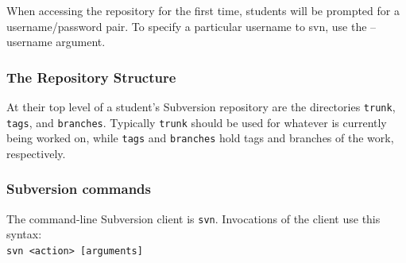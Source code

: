 When accessing the repository for the first time, students will be prompted for a username/password pair. To specify a particular username to svn, use the --username argument.

\subsubsection{The Repository Structure}

At their top level of a student's Subversion repository are the directories \texttt{trunk}, \texttt{tags}, and \texttt{branches}. Typically \texttt{trunk} should be used for whatever is currently being worked on, while \texttt{tags} and \texttt{branches} hold tags and branches of the work, respectively.

\subsubsection{Subversion commands}

The command-line Subversion client is \texttt{svn}. Invocations of the client use this syntax: \\

\texttt{svn <action> [arguments]}\\


